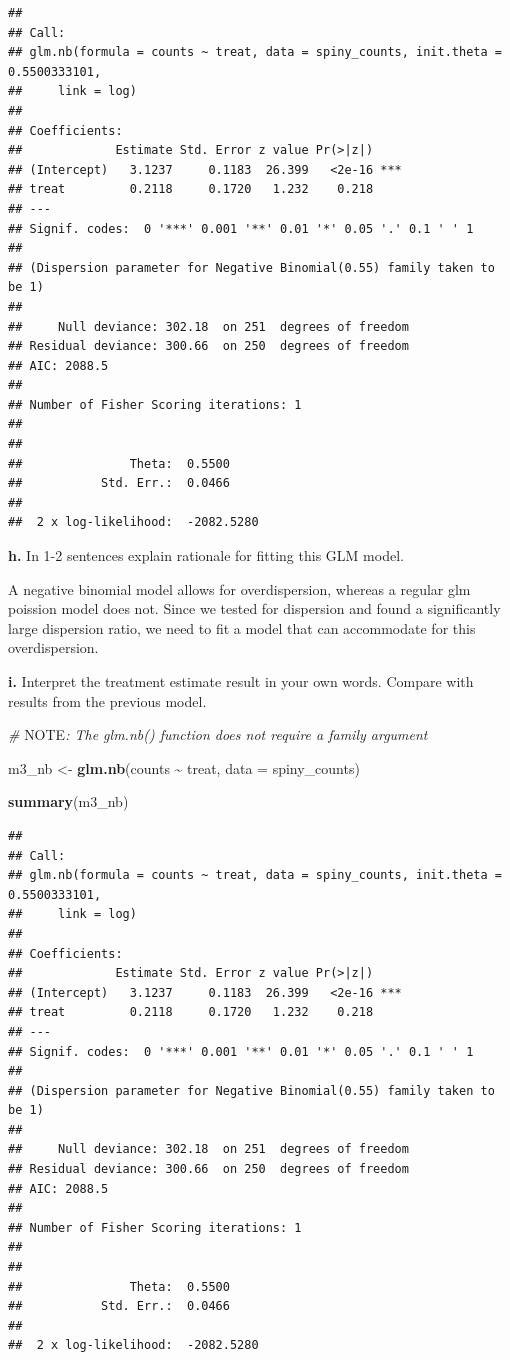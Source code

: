 \documentclass[
]{article}
\newenvironment{Shaded}{\begin{snugshade}}{\end{snugshade}}
\newcommand{\AlertTok}[1]{\textcolor[rgb]{0.94,0.16,0.16}{#1}}
\newcommand{\AttributeTok}[1]{\textcolor[rgb]{0.13,0.29,0.53}{#1}}
\newcommand{\CommentTok}[1]{\textcolor[rgb]{0.56,0.35,0.01}{\textit{#1}}}
\newcommand{\FunctionTok}[1]{\textcolor[rgb]{0.13,0.29,0.53}{\textbf{#1}}}
\newcommand{\NormalTok}[1]{#1}
\newcommand{\OtherTok}[1]{\textcolor[rgb]{0.56,0.35,0.01}{#1}}
\newcommand{\SpecialCharTok}[1]{\textcolor[rgb]{0.81,0.36,0.00}{\textbf{#1}}}
\begin{document}
\begin{verbatim}
## 
## Call:
## glm.nb(formula = counts ~ treat, data = spiny_counts, init.theta = 0.5500333101, 
##     link = log)
## 
## Coefficients:
##             Estimate Std. Error z value Pr(>|z|)    
## (Intercept)   3.1237     0.1183  26.399   <2e-16 ***
## treat         0.2118     0.1720   1.232    0.218    
## ---
## Signif. codes:  0 '***' 0.001 '**' 0.01 '*' 0.05 '.' 0.1 ' ' 1
## 
## (Dispersion parameter for Negative Binomial(0.55) family taken to be 1)
## 
##     Null deviance: 302.18  on 251  degrees of freedom
## Residual deviance: 300.66  on 250  degrees of freedom
## AIC: 2088.5
## 
## Number of Fisher Scoring iterations: 1
## 
## 
##               Theta:  0.5500 
##           Std. Err.:  0.0466 
## 
##  2 x log-likelihood:  -2082.5280
\end{verbatim}

\textbf{h.} In 1-2 sentences explain rationale for fitting this GLM
model.

A negative binomial model allows for overdispersion, whereas a regular
glm poission model does not. Since we tested for dispersion and found a
significantly large dispersion ratio, we need to fit a model that can
accommodate for this overdispersion.

\textbf{i.} Interpret the treatment estimate result in your own words.
Compare with results from the previous model.

\begin{Shaded}
\begin{Highlighting}[]
\CommentTok{\# }\AlertTok{NOTE}\CommentTok{: The \textasciigrave{}glm.nb()\textasciigrave{} function does not require a \textasciigrave{}family\textasciigrave{} argument}

\NormalTok{m3\_nb }\OtherTok{\textless{}{-}} \FunctionTok{glm.nb}\NormalTok{(counts }\SpecialCharTok{\textasciitilde{}}\NormalTok{ treat,}
                \AttributeTok{data =}\NormalTok{ spiny\_counts)}

\FunctionTok{summary}\NormalTok{(m3\_nb)}
\end{Highlighting}
\end{Shaded}

\begin{verbatim}
## 
## Call:
## glm.nb(formula = counts ~ treat, data = spiny_counts, init.theta = 0.5500333101, 
##     link = log)
## 
## Coefficients:
##             Estimate Std. Error z value Pr(>|z|)    
## (Intercept)   3.1237     0.1183  26.399   <2e-16 ***
## treat         0.2118     0.1720   1.232    0.218    
## ---
## Signif. codes:  0 '***' 0.001 '**' 0.01 '*' 0.05 '.' 0.1 ' ' 1
## 
## (Dispersion parameter for Negative Binomial(0.55) family taken to be 1)
## 
##     Null deviance: 302.18  on 251  degrees of freedom
## Residual deviance: 300.66  on 250  degrees of freedom
## AIC: 2088.5
## 
## Number of Fisher Scoring iterations: 1
## 
## 
##               Theta:  0.5500 
##           Std. Err.:  0.0466 
## 
##  2 x log-likelihood:  -2082.5280
\end{verbatim}
\end{document}

